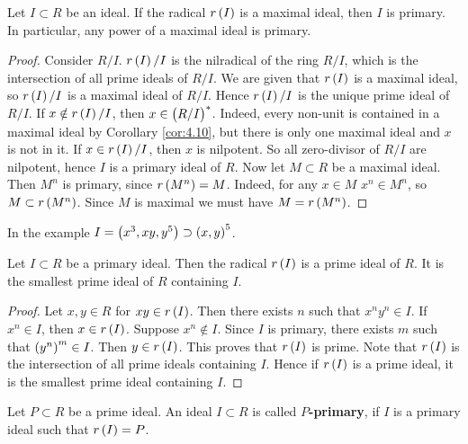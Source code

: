 \begin{proposition}
Let $ I \subset R $ be an ideal. If the radical $ r\br{I} $ is a maximal ideal, then $ I $ is primary. In particular, any power of a maximal ideal is primary.
\end{proposition}

\begin{proof}
Consider $ R / I $. $ r\br{I} / I $ is the nilradical of the ring $ R / I $, which is the intersection of all prime ideals of $ R / I $. We are given that $ r\br{I} $ is a maximal ideal, so $ r\br{I} / I $ is a maximal ideal of $ R / I $. Hence $ r\br{I} / I $ is the unique prime ideal of $ R / I $. If $ x \notin r\br{I} / I $, then $ x \in \br{R / I}^* $. Indeed, every non-unit is contained in a maximal ideal by Corollary \ref{cor:4.10}, but there is only one maximal ideal and $ x $ is not in it. If $ x \in r\br{I} / I $, then $ x $ is nilpotent. So all zero-divisor of $ R / I $ are nilpotent, hence $ I $ is a primary ideal of $ R $. Now let $ M \subset R $ be a maximal ideal. Then $ M^n $ is primary, since $ r\br{M^n} = M $. Indeed, for any $ x \in M $ $ x^n \in M^n $, so $ M \subset r\br{M^n} $. Since $ M $ is maximal we must have $ M = r\br{M^n} $.
\end{proof}

\begin{example*}
In the example $ I = \br{x^3, xy, y^5} \supset \br{x, y}^5 $.
\end{example*}

\begin{proposition}
\label{prop:11.3}
Let $ I \subset R $ be a primary ideal. Then the radical $ r\br{I} $ is a prime ideal of $ R $. It is the smallest prime ideal of $ R $ containing $ I $.
\end{proposition}

\begin{proof}
Let $ x, y \in R $ for $ xy \in r\br{I} $. Then there exists $ n $ such that $ x^ny^n \in I $. If $ x^n \in I $, then $ x \in r\br{I} $. Suppose $ x^n \notin I $. Since $ I $ is primary, there exists $ m $ such that $ \br{y^n}^m \in I $. Then $ y \in r\br{I} $. This proves that $ r\br{I} $ is prime. Note that $ r\br{I} $ is the intersection of all prime ideals containing $ I $. Hence if $ r\br{I} $ is a prime ideal, it is the smallest prime ideal containing $ I $.
\end{proof}

\begin{definition}
Let $ P \subset R $ be a prime ideal. An ideal $ I \subset R $ is called \textbf{$ P $-primary}, if $ I $ is a primary ideal such that $ r\br{I} = P $.
\end{definition}

